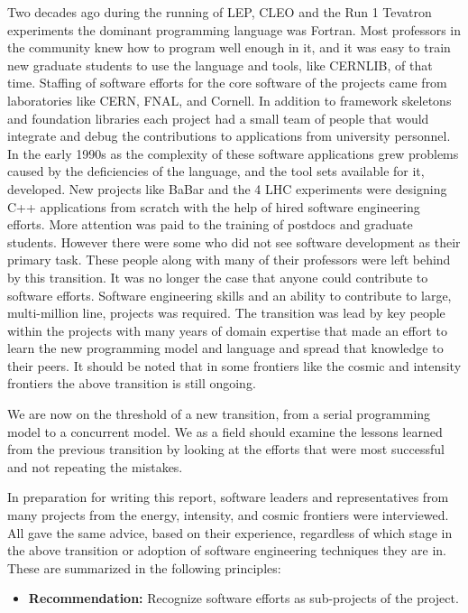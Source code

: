 Two decades ago during the running of LEP, CLEO and the Run 1
Tevatron experiments the dominant programming language was Fortran.
Most professors in the community knew how to program well enough
in it, and it was easy to train new graduate students to use the
language and tools, like CERNLIB, of that time.  Staffing of software
efforts for the core software of the projects came from laboratories
like CERN, FNAL, and Cornell.  In addition to framework skeletons
and foundation libraries each project had a small team of people
that would integrate and debug the contributions to applications
from university personnel. In the early 1990s as the complexity of these
software applications grew problems caused by the deficiencies
 of the language, and the tool sets 
available for it, developed. 
New projects like BaBar and the 4 LHC experiments were
designing C++ applications from scratch with the help of hired
software engineering efforts. More attention was paid to the training
of postdocs and graduate students. However there were some who did
not see software development as their primary task.  These people
along with many of their professors were left behind by this
transition.  It was no longer the case that anyone could contribute
to software efforts. Software engineering skills and an ability to
contribute to large, multi-million line, projects was required. The
transition was lead by key people within the projects with many
years of domain expertise that made an effort to learn the new
programming model and language and spread that knowledge to their
peers. It should be noted that in some frontiers like the cosmic
and intensity frontiers the above transition is still ongoing.

We are now on the threshold of a new transition, from a serial
programming model to a concurrent model. We as a field should examine
the lessons learned from the previous transition by looking at the
efforts that were most successful and not repeating the mistakes.

In preparation for writing this report, software leaders and
representatives from many projects from the energy, intensity,
and cosmic frontiers were interviewed.  All gave the same advice, based 
on their experience, regardless of which stage in the above transition or 
adoption of software engineering techniques they are in. These are 
summarized in the following principles:

\begin{itemize}
\item[] {\bf Recommendation:} Recognize software efforts as sub-projects of the project.  
\end{itemize}

